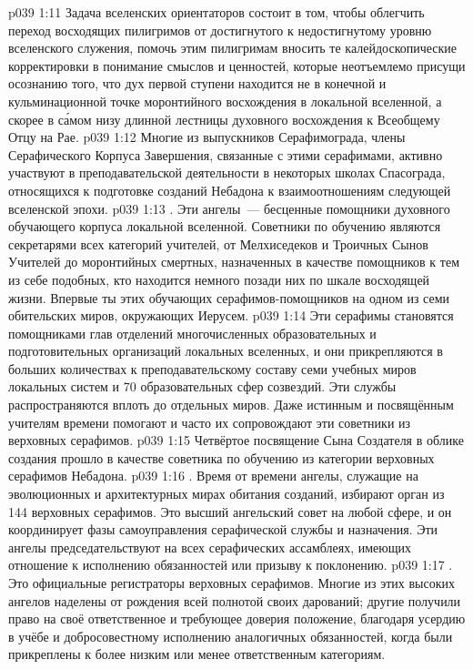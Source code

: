 \vs p039 1:11 Задача вселенских ориентаторов состоит в том, чтобы облегчить переход восходящих пилигримов от достигнутого к недостигнутому уровню вселенского служения, помочь этим пилигримам вносить те калейдоскопические корректировки в понимание смыслов и ценностей, которые неотъемлемо присущи осознанию того, что дух первой ступени находится не в конечной и кульминационной точке моронтийного восхождения в локальной вселенной, а скорее в с\'амом низу длинной лестницы духовного восхождения к Всеобщему Отцу на Рае.
\vs p039 1:12 Многие из выпускников Серафимограда, члены Серафического Корпуса Завершения, связанные с этими серафимами, активно участвуют в преподавательской деятельности в некоторых школах Спасограда, относящихся к подготовке созданий Небадона к взаимоотношениям следующей вселенской эпохи.
\vs p039 1:13 . Эти ангелы~--- бесценные помощники духовного обучающего корпуса локальной вселенной. Советники по обучению являются секретарями всех категорий учителей, от Мелхиседеков и Троичных Сынов Учителей до моронтийных смертных, назначенных в качестве помощников к тем из себе подобных, кто находится немного позади них по шкале восходящей жизни. Впервые ты  этих обучающих серафимов\hyp{}помощников на одном из семи обительских миров, окружающих Иерусем.
\vs p039 1:14 Эти серафимы становятся помощниками глав отделений многочисленных образовательных и подготовительных организаций локальных вселенных, и они прикрепляются в больших количествах к преподавательскому составу семи учебных миров локальных систем и 70 образовательных сфер созвездий. Эти службы распространяются вплоть до отдельных миров. Даже истинным и посвящённым учителям времени помогают и часто их сопровождают эти советники из верховных серафимов.
\vs p039 1:15 Четвёртое посвящение Сына Создателя в облике создания прошло в качестве советника по обучению из категории верховных серафимов Небадона.
\vs p039 1:16 . Время от времени ангелы, служащие на эволюционных и архитектурных мирах обитания созданий, избирают орган из 144 верховных серафимов. Это высший ангельский совет на любой сфере, и он координирует фазы самоуправления серафической службы и назначения. Эти ангелы председательствуют на всех серафических ассамблеях, имеющих отношение к исполнению обязанностей или призыву к поклонению.
\vs p039 1:17 . Это официальные регистраторы верховных серафимов. Многие из этих высоких ангелов наделены от рождения всей полнотой своих дарований; другие получили право на своё ответственное и требующее доверия положение, благодаря усердию в учёбе и добросовестному исполнению аналогичных обязанностей, когда были прикреплены к более низким или менее ответственным категориям.
